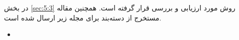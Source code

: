 در بخش \ref{sec:5:3} روش  مورد ارزیابی و بررسی قرار گرفته است. همچنین مقاله مستخرج از دسته‌بند  برای مجله زیر ارسال شده است.

\begin{LTR}
	\begin{itemize}[label=$\bullet$]
		\item {}
	\end{itemize}
\end{LTR}